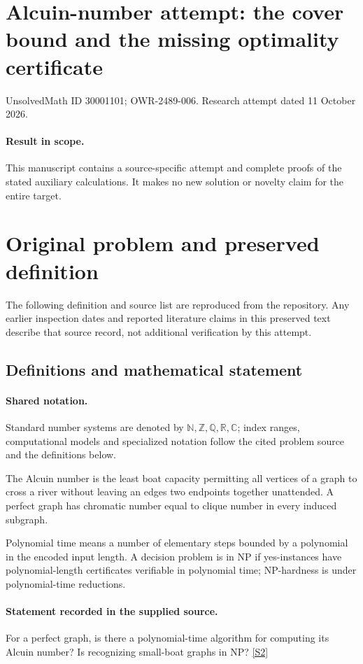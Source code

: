 \documentclass[11pt]{article}
\begin{document}
\section*{Alcuin-number attempt: the cover bound and the missing optimality certificate}
\noindent UnsolvedMath ID 30001101; OWR-2489-006. Research attempt dated 11 October 2026.
\paragraph{Result in scope.}This manuscript contains a source-specific attempt and complete proofs of the stated auxiliary calculations. It makes no new solution or novelty claim for the entire target.
\section{Original problem and preserved definition}
The following definition and source list are reproduced from the repository. Any earlier inspection dates and reported literature claims in this preserved text describe that source record, not additional verification by this attempt.
\subsection{Definitions and mathematical statement}

\paragraph{Shared notation.}Standard number systems are denoted by $\mathbb N,\mathbb Z,\mathbb Q,\mathbb R,\mathbb C$; index ranges, computational models and specialized notation follow the cited problem source and the definitions below.


The Alcuin number is the least boat capacity permitting all vertices of a graph to cross a river without leaving an edge\textquotesingle s two endpoints together unattended. A perfect graph has chromatic number equal to clique number in every induced subgraph.

Polynomial time means a number of elementary steps bounded by a polynomial in the encoded input length. A decision problem is in $\mathrm{NP}$ if yes-instances have polynomial-length certificates verifiable in polynomial time; NP-hardness is under polynomial-time reductions.
\paragraph{Statement recorded in the supplied source.}
For a perfect graph, is there a polynomial-time algorithm for computing its Alcuin number? Is recognizing small-boat graphs in NP? \href{https://doi.org/10.4171/owr/2008/51}{[S2]}
\end{document}
